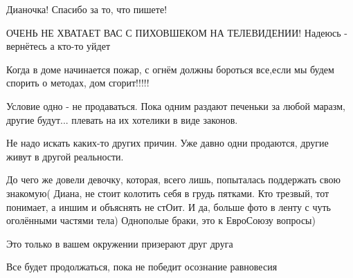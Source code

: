 \begin{itemize}
Дианочка! Спасибо за то, что пишете!

ОЧЕНЬ НЕ ХВАТАЕТ ВАС С ПИХОВШЕКОМ НА ТЕЛЕВИДЕНИИ! Надеюсь - вернётесь а кто-то
уйдет

 
Когда в доме начинается пожар, с огнём должны бороться все,если мы будем спорить о методах, дом сгорит!!!!!

 

Условие одно - не продаваться. Пока одним раздают печеньки за любой маразм,
другие будут... плевать на их хотелики в виде законов.

Не надо искать каких-то других причин. Уже давно одни продаются, другие живут в
другой реальности.


 

До чего же довели девочку, которая, всего лишь, попыталась поддержать свою
знакомую( Диана, не стоит колотить себя в грудь пятками. Кто трезвый, тот
понимает, а иншим и объяснять не стОит. И да, больше фото в ленту с чуть
оголёнными частями тела) Однополые браки, это к ЕвроСоюзу вопросы)

 
Это только в вашем окружении призерают друг друга

 
Все будет продолжаться, пока не победит осознание равновесия

 

\end{itemize}
